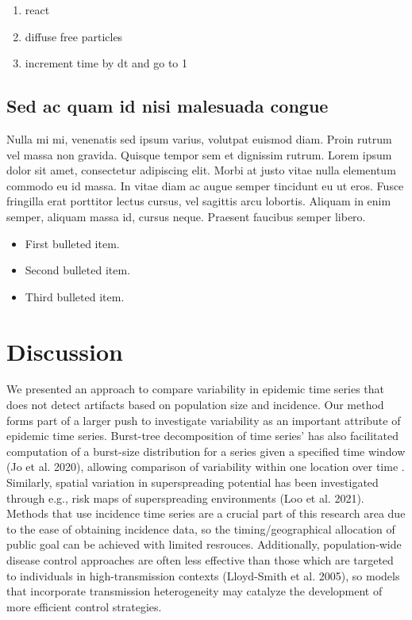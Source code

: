 \documentclass[10pt,letterpaper]{article}
\begin{document}
\begin{enumerate}
	\item{react}
	\item{diffuse free particles}
	\item{increment time by dt and go to 1}
\end{enumerate}


\subsection*{Sed ac quam id nisi malesuada congue}

Nulla mi mi, venenatis sed ipsum varius, volutpat euismod diam. Proin rutrum vel massa non gravida. Quisque tempor sem et dignissim rutrum. Lorem ipsum dolor sit amet, consectetur adipiscing elit. Morbi at justo vitae nulla elementum commodo eu id massa. In vitae diam ac augue semper tincidunt eu ut eros. Fusce fringilla erat porttitor lectus cursus, vel sagittis arcu lobortis. Aliquam in enim semper, aliquam massa id, cursus neque. Praesent faucibus semper libero.

\begin{itemize}
	\item First bulleted item.
	\item Second bulleted item.
	\item Third bulleted item.
\end{itemize}

\section*{Discussion}
We presented an approach to compare variability in epidemic time series that does not detect artifacts based on population size and incidence. Our method forms part of a larger push to investigate variability as an important attribute of epidemic time series. Burst-tree decomposition of time series’ has also facilitated computation of a burst-size distribution for a series given a specified time window (Jo et al. 2020), allowing comparison of variability within one location over time . Similarly, spatial variation in superspreading potential has been investigated through e.g., risk maps of superspreading environments (Loo et al. 2021). Methods that use incidence time series are a crucial part of this research area due to the ease of obtaining incidence data, so the timing/geographical allocation of public  goal can be achieved with limited resrouces. Additionally, population-wide disease control approaches are often less effective than those which are targeted to individuals in high-transmission contexts (Lloyd-Smith et al. 2005), so models that incorporate transmission heterogeneity may catalyze the development of more efficient control strategies.
\end{document}
